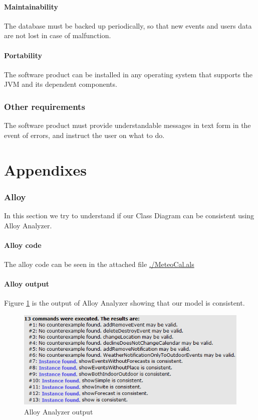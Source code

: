\documentclass[10pt,a4paper,titlepage]{article}
\begin{document}
\subsection{Maintainability}
The database must be backed up periodically, so that new events and users data are not lost
in case of malfunction.

\subsection{Portability}
The software product can be installed in any operating system that supports the JVM and its dependent components.

\section{Other requirements}
The software product must provide understandable messages in text form in the event of
errors, and instruct the user on what to do.

\clearpage
\part{Appendixes}

\section{Alloy}
In this section we try to understand if our Class Diagram can be consistent using Alloy Analyzer.

\subsection{Alloy code}
The alloy code can be seen in the attached file \url{./MeteoCal.als}

\subsection{Alloy output}
Figure \ref{fig:AlloyOut} is the output of Alloy Analyzer showing that our model is consistent.
\begin{figure}[h!]
\centering
\includegraphics[width=\linewidth]{./Alloy/AlloyOutput.png}
\caption[AlloyOut]{Alloy Analyzer output}
\label{fig:AlloyOut}
\end{figure}
\end{document}
